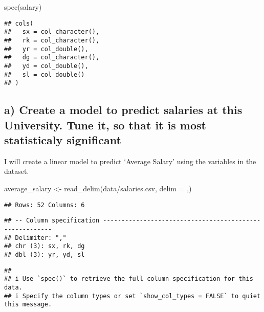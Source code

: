 \documentclass[
]{article}
\newenvironment{Shaded}{\begin{snugshade}}{\end{snugshade}}
\newcommand{\AttributeTok}[1]{\textcolor[rgb]{0.77,0.63,0.00}{#1}}
\newcommand{\FunctionTok}[1]{\textcolor[rgb]{0.00,0.00,0.00}{#1}}
\newcommand{\NormalTok}[1]{#1}
\newcommand{\OtherTok}[1]{\textcolor[rgb]{0.56,0.35,0.01}{#1}}
\newcommand{\StringTok}[1]{\textcolor[rgb]{0.31,0.60,0.02}{#1}}
\begin{document}
\begin{Shaded}
\begin{Highlighting}[]
\FunctionTok{spec}\NormalTok{(salary)}
\end{Highlighting}
\end{Shaded}

\begin{verbatim}
## cols(
##   sx = col_character(),
##   rk = col_character(),
##   yr = col_double(),
##   dg = col_character(),
##   yd = col_double(),
##   sl = col_double()
## )
\end{verbatim}

\hypertarget{a-create-a-model-to-predict-salaries-at-this-university.-tune-it-so-that-it-is-most-statisticaly-significant}{%
\subsection{a) Create a model to predict salaries at this University.
Tune it, so that it is most statisticaly
significant}\label{a-create-a-model-to-predict-salaries-at-this-university.-tune-it-so-that-it-is-most-statisticaly-significant}}

I will create a linear model to predict `Average Salary' using the
variables in the dataset.

\begin{Shaded}
\begin{Highlighting}[]
\NormalTok{average\_salary }\OtherTok{\textless{}{-}} \FunctionTok{read\_delim}\NormalTok{(}\StringTok{\textquotesingle{}data/salaries.csv\textquotesingle{}}\NormalTok{, }\AttributeTok{delim =} \StringTok{\textquotesingle{},\textquotesingle{}}\NormalTok{)}
\end{Highlighting}
\end{Shaded}

\begin{verbatim}
## Rows: 52 Columns: 6
\end{verbatim}

\begin{verbatim}
## -- Column specification --------------------------------------------------------
## Delimiter: ","
## chr (3): sx, rk, dg
## dbl (3): yr, yd, sl
\end{verbatim}

\begin{verbatim}
## 
## i Use `spec()` to retrieve the full column specification for this data.
## i Specify the column types or set `show_col_types = FALSE` to quiet this message.
\end{verbatim}
\end{document}
